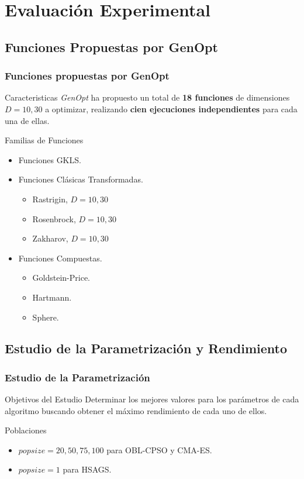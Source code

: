 \section{Evaluación Experimental}
\subsection{Funciones Propuestas por GenOpt}
\begin{frame}
\frametitle{Funciones propuestas por GenOpt}
\begin{block}{Caracteristicas}
\textit{GenOpt} ha propuesto un total de \textbf{18 funciones} de dimensiones $D = 10, 30$ a optimizar, realizando \textbf{cien ejecuciones independientes} para cada una de ellas.
\end{block}
\begin{block}{Familias de Funciones}
\begin{itemize}
	\item Funciones GKLS.
	\item Funciones Clásicas Transformadas.
	 \begin{itemize}
    	\item Rastrigin, $D = 10, 30$ 
    	\item Rosenbrock, $D = 10, 30$ 
    	\item Zakharov, $D = 10, 30$ 
    \end{itemize}
	\item Funciones Compuestas.
	 \begin{itemize}
    	  	\item Goldstein-Price.
    	  	\item Hartmann. 
    	  	\item Sphere.
    	  \end{itemize}
\end{itemize}
\end{block}
\end{frame}

\subsection{Estudio de la Parametrización y Rendimiento}

\begin{frame}
\frametitle{Estudio de la Parametrización}
\begin{block}{Objetivos del Estudio}
Determinar los mejores valores para los parámetros de cada algoritmo buscando obtener el máximo rendimiento de cada uno de ellos.
\end{block}
\begin{block}{Poblaciones}
\begin{itemize}
	\item $popsize = 20, 50, 75, 100$ para OBL-CPSO y CMA-ES.
	\item $popsize = 1$ para HSAGS.
	\end{itemize}
\end{block}
\end{frame}

